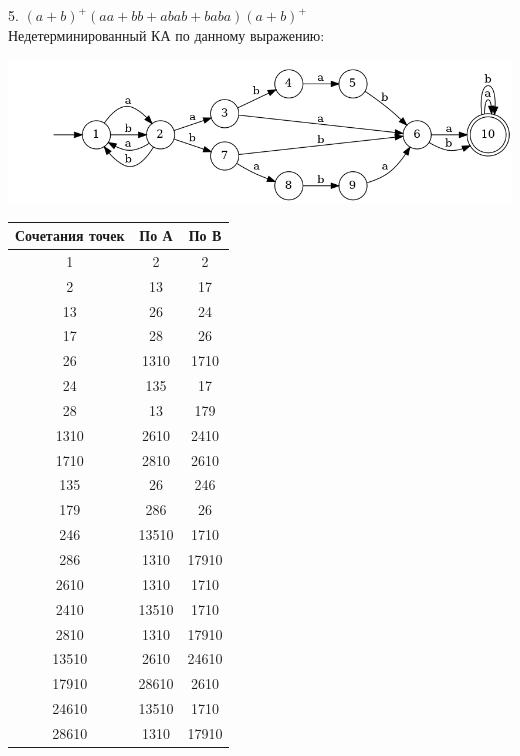\documentclass{article}
\begin{document}
    5. $(a+b)^+(aa+bb+abab+baba)(a+b)^+$\\
    Недетерминированный КА по данному выражению:
    \begin{center}
        \includegraphics[width=1\textwidth]{pic3_5_1.dot}\\
    \end{center}
    \begin{center}
        \begin{tabular}{|c|c|c|}
            \hline
            Сочетания точек & По А & По В \\
            \hline
                1 & 2 & 2\\
                2 & 13 & 17\\
                13 & 26 & 24 \\
                17 & 28 & 26\\
                26 & 1310 & 1710 \\
                24 & 135 & 17 \\
                28 & 13 & 179 \\
                1310 & 2610 & 2410 \\
                1710 & 2810 & 2610 \\
                135 & 26 & 246 \\
                179 & 286 & 26 \\
                246 & 13510 & 1710 \\
                286 & 1310 & 17910 \\
                2610 & 1310 & 1710 \\
                2410 & 13510 & 1710 \\
                2810 & 1310 & 17910 \\
                13510 & 2610 & 24610 \\
                17910 & 28610 & 2610 \\
                24610 & 13510 & 1710 \\
                28610 & 1310 & 17910 \\
            \hline
        \end{tabular}\\
    \end{center}
\end{document}
